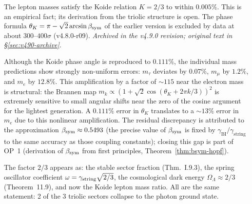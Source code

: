 \begin{theorem}\label{thm:koide-triolic}
The lepton masses satisfy the Koide relation \(K=2/3\) to within \(0.005\%\).  This is an empirical fact; its derivation from the triolic structure is open.  The phase formula \(\theta_K=\pi-\sqrt2\arcsin\beta_{\mathrm{sym}}\) of the earlier version is excluded by data at about \(300\)--\(400\sigma\) (v4.8.0-r09).
\emph{Archived in the v4.9.0 revision; original text in \S\ref{sec:v490-archive}.}
\end{theorem}

\begin{remark}
\label{rem:koide-mass-discrepancy}
Although the Koide phase angle is reproduced to $0.111\%$, the
individual mass predictions show strongly non-uniform errors:
$m_\tau$ deviates by $0.07\%$, $m_\mu$ by $1.2\%$, and $m_e$ by $12.8\%$.
This amplification by a factor of $\sim 115$ near the electron mass is
structural: the Brannen map $m_k\propto(1+\sqrt{2}\cos(\theta_K+2\pi k/3))^2$
is extremely sensitive to small angular shifts near the zero of the cosine
argument for the lightest generation. A $0.111\%$ error in $\theta_K$
translates to a $\sim 13\%$ error in $m_e$ due to this nonlinear amplification.
The residual discrepancy is attributed to the approximation $\beta_{\mathrm{sym}}\approx 0.5493$
(the precise value of $\beta_{\mathrm{sym}}$ is fixed by $\gamma_{\mathrm{BI}}/\gamma_{\mathrm{string}}$
to the same accuracy as those coupling constants); closing this gap is
part of OP~1 (derivation of $\beta_{\mathrm{sym}}$ from first principles,
Theorem~\ref{thm:bsym-hopf}).
\end{remark}

\begin{remark}
The factor $2/3$ appears as: the stable sector fraction (Thm.~I.9.3),
the spring oscillator coefficient $\omega=\gamma_{\mathrm{string}}\sqrt{2/3}$, the
cosmological dark energy $\Omega_\Lambda\approx 2/3$ (Theorem~11.9),
and now the Koide lepton mass ratio.
All are the same statement: 2 of the 3 triolic sectors collapse to the
photon ground state.
\end{remark}

